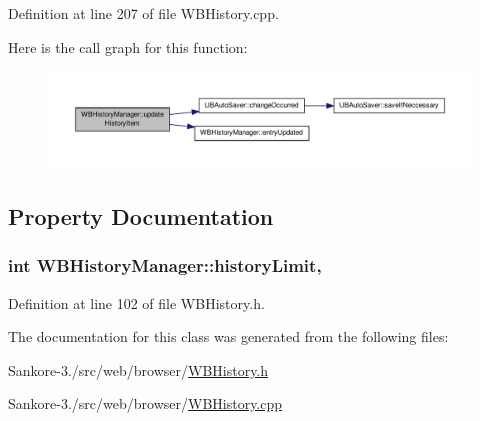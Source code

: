 Definition at line 207 of file W\-B\-History.\-cpp.



Here is the call graph for this function\-:
\nopagebreak
\begin{figure}[H]
\begin{center}
\leavevmode
\includegraphics[width=350pt]{dd/d34/class_w_b_history_manager_a23ef7e0b61749b3b33591e9ca6413a4a_cgraph}
\end{center}
\end{figure}




\subsection{Property Documentation}
\hypertarget{class_w_b_history_manager_ac239829b6d6ba9045ee8f2e7951e97d0}{
\subsubsection[{history\-Limit}]{\setlength{\rightskip}{0pt plus 5cm}int W\-B\-History\-Manager\-::history\-Limit\hspace{0.3cm}{\ttfamily [read]}, {\ttfamily [write]}}}\label{dd/d34/class_w_b_history_manager_ac239829b6d6ba9045ee8f2e7951e97d0}


Definition at line 102 of file W\-B\-History.\-h.



The documentation for this class was generated from the following files\-:\begin{DoxyCompactItemize}
\item 
Sankore-\/3./src/web/browser/\hyperlink{_w_b_history_8h}{W\-B\-History.\-h}\item 
Sankore-\/3./src/web/browser/\hyperlink{_w_b_history_8cpp}{W\-B\-History.\-cpp}\end{DoxyCompactItemize}
